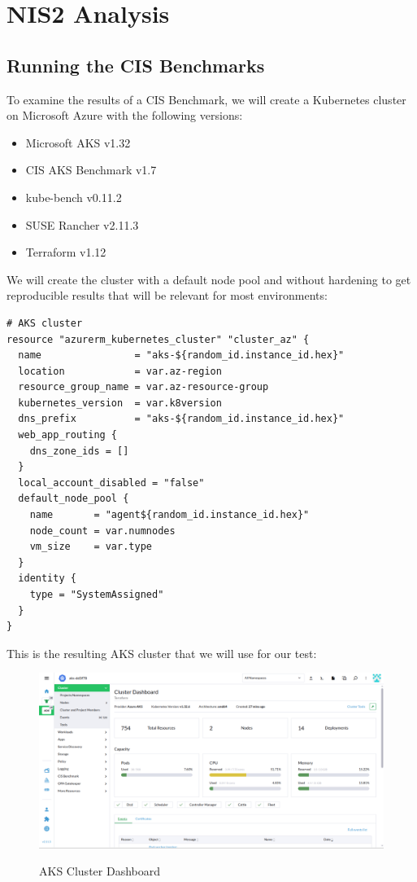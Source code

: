 %
%

\pagebreak
\section{NIS2 Analysis}

\onehalfspacing

\subsection{Running the CIS Benchmarks}

To examine the results of a CIS Benchmark, we will create a Kubernetes cluster on Microsoft Azure with the following versions:

\begin{itemize}
    \item Microsoft AKS v1.32
    \item CIS AKS Benchmark v1.7
    \item kube-bench v0.11.2
    \item SUSE Rancher v2.11.3
    \item Terraform v1.12
\end{itemize}

We will create the cluster with a default node pool and without hardening to get reproducible results that will be relevant for most environments:

\begin{lstlisting}[caption=Terraform Plan, frame=single, basicstyle=\ttfamily]
# AKS cluster
resource "azurerm_kubernetes_cluster" "cluster_az" {
  name                = "aks-${random_id.instance_id.hex}"
  location            = var.az-region
  resource_group_name = var.az-resource-group
  kubernetes_version  = var.k8version
  dns_prefix          = "aks-${random_id.instance_id.hex}"
  web_app_routing {
    dns_zone_ids = []
  }
  local_account_disabled = "false"
  default_node_pool {
    name       = "agent${random_id.instance_id.hex}"
    node_count = var.numnodes
    vm_size    = var.type
  }
  identity {
    type = "SystemAssigned"
  }
}            
\end{lstlisting}
This is the resulting AKS cluster that we will use for our test:

\begin{figure}[H]
\centering
\caption {AKS Cluster Dashboard}
\includegraphics[width=\linewidth]{images/aks-dd3f78.png}
\label{fig:aksdd3f78}
\end{figure}

